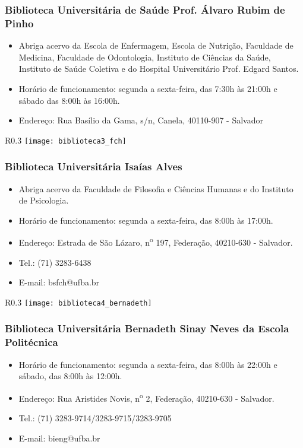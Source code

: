    \subsubsection{Biblioteca Universitária de Saúde Prof. Álvaro Rubim de Pinho}
        \begin{itemize}
            \item Abriga acervo da Escola de Enfermagem, Escola de Nutrição, Faculdade de Medicina, Faculdade de Odontologia, Instituto de Ciências da Saúde, Instituto de Saúde Coletiva e do Hospital Universitário Prof. Edgard Santos.
            \item Horário de funcionamento: segunda a sexta-feira, das 7:30h às 21:00h e sábado das 8:00h às 16:00h.
            \item Endereço: Rua Basílio da Gama, s/n, Canela, 40110-907 - Salvador
        \end{itemize}
    \begin{wrapfigure}{R}{0.3\textwidth}
            \centering
            \texttt{[image: biblioteca3\_fch]}
    \end{wrapfigure}
    \subsubsection{Biblioteca Universitária Isaías Alves}
        \begin{itemize}
            \item Abriga acervo da Faculdade de Filosofia e Ciências Humanas e do Instituto de Psicologia.
            \item Horário de funcionamento: segunda a sexta-feira, das 8:00h às 17:00h.
            \item Endereço: Estrada de São Lázaro, n\textsuperscript{o} 197, Federação, 40210-630 - Salvador.
            \item Tel.: (71) 3283-6438
            \item E-mail: bsfch@ufba.br
        \end{itemize}
    
    \begin{wrapfigure}{R}{0.3\textwidth}
            \centering
            \texttt{[image: biblioteca4\_bernadeth]}
    \end{wrapfigure}
    \subsubsection{Biblioteca Universitária Bernadeth Sinay Neves da Escola Politécnica}
        \begin{itemize}
            \item Horário de funcionamento: segunda a sexta-feira, das 8:00h às 22:00h e sábado, das 8:00h às 12:00h.
            \item Endereço: Rua Aristides Novis, n\textsuperscript{o} 2, Federação, 40210-630 - Salvador.
            \item Tel.: (71) 3283-9714/3283-9715/3283-9705
            \item E-mail: bieng@ufba.br
        \end{itemize}
        
